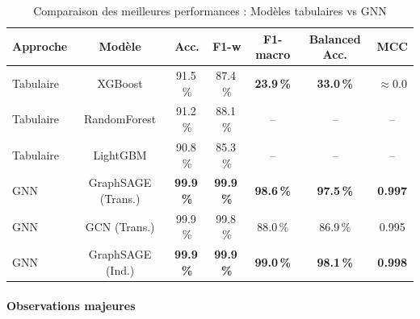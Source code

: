 ﻿\documentclass[11pt,a4paper]{article}
\begin{document}
\begin{table}[htbp]
\centering
\caption{Comparaison des meilleures performances : Modèles tabulaires vs GNN}
\label{tab:comparison_tabular_gnn}
\begin{tabular}{lcccccc}
\toprule
\textbf{Approche} & \textbf{Modèle} & \textbf{Acc.} & \textbf{F1-w} & \textbf{F1-macro} & \textbf{Balanced Acc.} & \textbf{MCC} \\
\midrule
Tabulaire & XGBoost & 91.5\,\% & 87.4\,\% & \textbf{23.9\,\%} & \textbf{33.0\,\%} & $\approx$0.0 \\
Tabulaire & RandomForest & 91.2\,\% & 88.1\,\% & --  & -- & -- \\
Tabulaire & LightGBM & 90.8\,\% & 85.3\,\% & -- & -- & -- \\
\midrule
GNN & GraphSAGE (Trans.) & \textbf{99.9\,\%} & \textbf{99.9\,\%} & \textbf{98.6\,\%} & \textbf{97.5\,\%} & \textbf{0.997} \\
GNN & GCN (Trans.) & 99.9\,\% & 99.8\,\% & 88.0\,\% & 86.9\,\% & 0.995 \\
GNN & GraphSAGE (Ind.) & \textbf{99.9\,\%} & \textbf{99.9\,\%} & \textbf{99.0\,\%} & \textbf{98.1\,\%} & \textbf{0.998} \\
\bottomrule
\end{tabular}
\end{table}

\paragraph{Observations majeures}
\end{document}
